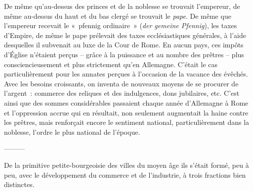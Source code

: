 \documentclass[french,twoside]{book} %
\begin{document}
\hline
\noindent De même qu’au-dessus des princes et de la noblesse se trouvait l’empereur, de même au-dessus du haut et du bas clergé se trouvait le \emph{pape}. De même que l’empereur recevait le « pfennig ordinaire » (\emph{der gemeine Pfennig}), les taxes d’Empire, de même le pape prélevait des taxes ecclésiastiques générales, à l’aide desquelles il subvenait au luxe de la Cour de Rome. En aucun pays, ces impôts d’Église n’étaient perçus – grâce à la puissance et au nombre des prêtres – plus consciencieusement et plus strictement qu’en Allemagne. C’était le cas particulièrement pour les annates perçues à l’occasion de la vacance des évêchés. Avec les besoins croissants, on inventa de nouveaux moyens de se procurer de l’argent : commerce des reliques et des indulgences, dons jubilaires, etc. C’est ainsi que des sommes considérables passaient chaque année d’Allemagne à Rome et l’oppression accrue qui en résultait, non seulement augmentait la haine contre les prêtres, mais renforçait encore le sentiment national, particulièrement dans la noblesse, l’ordre le plus national de l’époque.\par
———\par
\noindent De la primitive petite-bourgeoisie des villes du moyen âge ils s’était formé, peu à peu, avec le développement du commerce et de l’industrie, à trois fractions bien distinctes.\par
\end{document}
